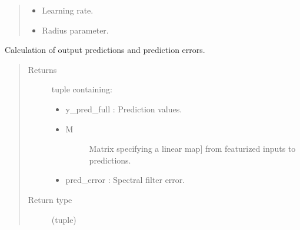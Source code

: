 \documentclass[letterpaper,10pt,english]{sphinxmanual}
\begin{document}
\begin{fulllineitems}
\begin{quote}
\begin{description}
\begin{itemize}
\item {} 
\sphinxAtStartPar
{} \textendash{} Learning rate.

\item {} 
\sphinxAtStartPar
{} \textendash{} Radius parameter.

\end{itemize}

\end{description}\end{quote}

\begin{fulllineitems}
\label{\detokenize{LDS.LDS.filters:LDS.LDS.filters.wave_filtering_siso.WaveFilteringSISO.predict}}
\sphinxAtStartPar
Calculation of output predictions and prediction errors.
\begin{quote}\begin{description}
\item[{Returns}] \leavevmode
\sphinxAtStartPar

\sphinxAtStartPar
tuple containing:
\begin{itemize}
\item {} 
\sphinxAtStartPar
y\_pred\_full : Prediction values.

\item {} \begin{description}
\item[{M}] \leavevmode{[}Matrix specifying a linear map{]}
\sphinxAtStartPar
from featurized inputs to predictions.

\end{description}

\item {} 
\sphinxAtStartPar
pred\_error  : Spectral filter error.

\end{itemize}


\item[{Return type}] \leavevmode
\sphinxAtStartPar
(tuple)

\end{description}\end{quote}

\end{fulllineitems}


\end{fulllineitems}
\end{document}
